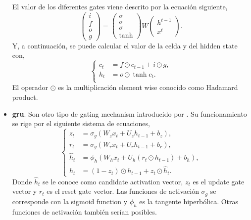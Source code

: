 \begin{itemize}
  El valor de los diferentes gates viene descrito por la ecuación siguiente,
  \begin{equation}
    \begin{pmatrix}
      i \\
      f \\
      o \\
      g
    \end{pmatrix} =
    \begin{pmatrix}
      \sigma \\
      \sigma \\
      \sigma \\
      \tanh
    \end{pmatrix}
    W
    \begin{pmatrix}
      h^{t-1} \\
      x^t
    \end{pmatrix}.
  \end{equation}
  Y, a continuación, se puede calcular el valor de la celda y del hidden state con,
  \begin{equation}
    \begin{cases}
      c_t &= f \odot c_{t-1} + i \odot g, \\
      h_t &= o \odot \tanh c_{t}. \\
    \end{cases}
  \end{equation}
  El operador \(\odot\) es la multiplicación element wise conocido como
  Hadamard product.
  \item \textbf{\gls*{gru}}. Son otro tipo de gating mechanism introducido por
  . Su funcionamiento se rige por el siguiente sistema
  de ecuaciones,
  \begin{equation}
    \begin{cases}
      z_{t}&=\sigma _{g}(W_{z}x_{t}+U_{z}h_{t-1}+b_{z}), \\
      r_{t}&=\sigma _{g}(W_{r}x_{t}+U_{r}h_{t-1}+b_{r}), \\
      {\hat {h}}_{t}&=\phi _{h}(W_{h}x_{t}+U_{h}(r_{t}\odot h_{t-1})+b_{h}), \\
      h_{t}&=(1-z_{t})\odot h_{t-1}+z_{t}\odot {\hat {h}}_{t}.
    \end{cases}
  \end{equation}
  Donde \(\hat{h}_t\) se le conoce como candidate activation vector, \(z_t\) es
  el update gate vector y \(r_t\) es el reset gate vector. Las funciones de
  activación \(\sigma_g\) se corresponde con la sigmoid function y
  \(\phi_{h}\) es la tangente hiperbólica. Otras funciones de activación
  también serían posibles.
\end{itemize}

